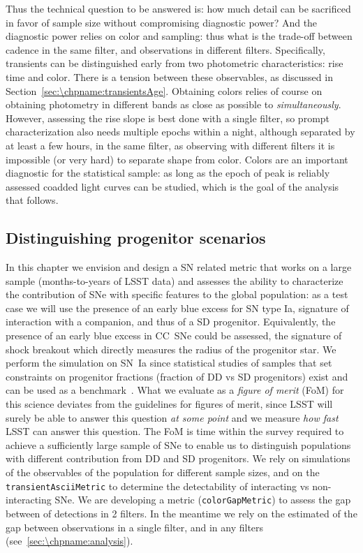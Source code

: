 Thus the technical question to be answered is: how much detail can be
sacrificed in favor of sample size without compromising diagnostic
power? And the diagnostic power relies on color and sampling: thus
what is the trade-off between cadence in the same filter, and
observations in different filters. Specifically, transients can be
distinguished early from two photometric characteristics: rise time
and color. There is a tension between these observables, as discussed
in Section~\ref{sec:\chpname:transientsAge}. Obtaining colors relies
of course on obtaining photometry in different bands as close as
possible to \emph{simultaneously}.  However, assessing the rise slope
is best done with a single filter, so prompt characterization also
needs multiple epochs within a night, although separated by at least a
few hours, in the same filter, as observing with different
filters it is impossible (or very hard) to separate shape from
color. Colors are an important diagnostic for the
statistical sample: as long as the epoch of peak is reliably assessed
coadded light curves can be studied, which is the goal of the analysis
that follows.

\subsection{Distinguishing progenitor scenarios}

In this chapter we envision and design a SN related metric that works
on a large sample (months-to-years of LSST data) and assesses the
ability to characterize the contribution of SNe with specific features
to the global population: as a test case we will use the presence of
an early blue excess for SN type Ia, signature of interaction with a
companion, and thus of a SD progenitor. Equivalently, the presence of
an early blue excess in CC~SNe could be assessed, the signature of
shock breakout which directly measures the radius of the progenitor
star. We perform the simulation on SN~Ia since statistical studies of
samples that set constraints on progenitor fractions (fraction of DD
vs SD progenitors) exist and can be used as a
benchmark~\citep{Hayden2010, Bianco11}.  What we evaluate as a
\emph{figure of merit} (FoM) for this science deviates from the
guidelines for figures of merit, since LSST will surely be able to
answer this question \emph{at some point} and we measure \emph{how
  fast} LSST can answer this question. The FoM is time
within the survey required to achieve a sufficiently large sample of
SNe to enable us to distinguish
populations with different contribution from DD and SD progenitors.
We rely on simulations of the observables of the population for
different sample sizes, and on the \texttt{transientAsciiMetric} to
determine the detectability of interacting vs non-interacting
SNe. We are developing a metric (\texttt{colorGapMetric}) to assess
the gap between of detections in 2 filters. In the meantime we rely on
the estimated of the gap between observations in a single filter, and
in any filters (see~\autoref{sec:\chpname:analysis}).

